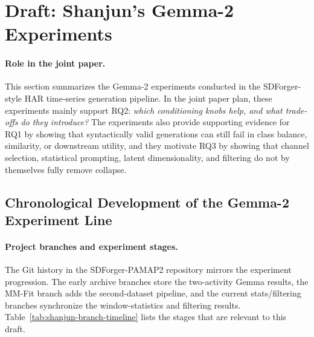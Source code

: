 
\section*{Draft: Shanjun's Gemma-2 Experiments}

\paragraph{Role in the joint paper.}
This section summarizes the Gemma-2 experiments conducted in the SDForger-style
HAR time-series generation pipeline. In the joint paper plan, these experiments
mainly support RQ2: \emph{which conditioning knobs help, and what trade-offs do
they introduce?} The experiments also provide supporting evidence for RQ1 by
showing that syntactically valid generations can still fail in class balance,
similarity, or downstream utility, and they motivate RQ3 by showing that channel
selection, statistical prompting, latent dimensionality, and filtering do not by
themselves fully remove collapse.

\subsection*{Chronological Development of the Gemma-2 Experiment Line}

\paragraph{Project branches and experiment stages.}
The Git history in the SDForger-PAMAP2 repository mirrors the experiment
progression. The early archive branches store the two-activity Gemma results,
the MM-Fit branch adds the second-dataset pipeline, and the current
stats/filtering branches synchronize the window-statistics and filtering
results. Table~\ref{tab:shanjun-branch-timeline} lists the stages that are
relevant to this draft.

